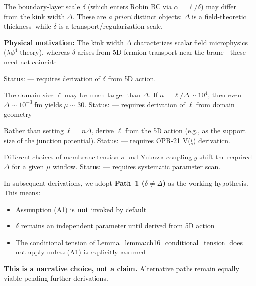 \begin{description}[leftmargin=2em, style=nextline]
    \item[Path 1: $\delta \neq \Delta$ \hfill \textcolor{blue}{\textbf{(WD)}}]
    The boundary-layer scale $\delta$ (which enters Robin BC via
    $\alpha = \ell/\delta$) may differ from the kink width $\Delta$.
    These are \emph{a priori} distinct objects: $\Delta$ is a field-theoretic
    thickness, while $\delta$ is a transport/regularization scale.

    \textbf{Physical motivation:} The kink width $\Delta$ characterizes scalar
    field microphysics ($\lambda\phi^4$ theory), whereas $\delta$ arises from
    5D fermion transport near the brane—these need not coincide.

    Status: \tagP{} — requires derivation of $\delta$ from 5D action.

    \item[Path 2: $n \gg 4$]
    The domain size $\ell$ may be much larger than $\Delta$. If $n = \ell/\Delta
    \sim 10^4$, then even $\Delta \sim 10^{-3}$ fm yields $\mu \sim 30$.
    Status: \tagP{} — requires derivation of $\ell$ from domain geometry.

    \item[Path 3: Derive $\ell$ independently]
    Rather than setting $\ell = n\Delta$, derive $\ell$ from the 5D action
    (e.g., as the support size of the junction potential).
    Status: \tagP{} — requires OPR-21 V($\xi$) derivation.

    \item[Path 4: Revisit $\sigma$/$y$ combinations]
    Different choices of membrane tension $\sigma$ and Yukawa coupling $y$
    shift the required $\Delta$ for a given $\mu$ window.
    Status: \tagP{} — requires systematic parameter scan.
\end{description}

\begin{tcolorbox}[colback=blue!5!white, colframe=blue!50!black,
    title=\textbf{Working Default (WD): Path 1}]
In subsequent derivations, we adopt \textbf{Path~1 ($\delta \neq \Delta$)} as
the working hypothesis. This means:
\begin{itemize}[nosep]
    \item Assumption (A1) is \textbf{not} invoked by default
    \item $\delta$ remains an independent parameter until derived from 5D action
    \item The conditional tension of Lemma~\ref{lemma:ch16_conditional_tension}
          does not apply unless (A1) is explicitly assumed
\end{itemize}

\textbf{This is a narrative choice, not a claim.} Alternative paths remain
equally viable pending further derivations.
\end{tcolorbox}


